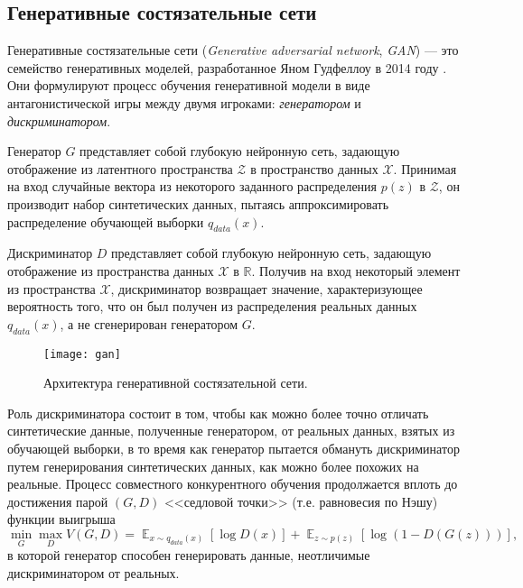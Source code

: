 
\subsection{Генеративные состязательные сети}

Генеративные состязательные сети (\emph{Generative adversarial network},  \emph{GAN}) --- это семейство генеративных моделей, разработанное Яном Гудфеллоу в 2014 году \cite{goodfellow2014generative}.  Они формулируют процесс обучения  генеративной модели в виде антагонистической игры между двумя игроками: \emph{генератором} и \emph{дискриминатором}.

Генератор $G$ представляет собой глубокую нейронную сеть, задающую отображение из латентного пространства $\mathcal Z$ в пространство данных $\mathcal X$.
Принимая на вход случайные вектора из некоторого заданного распределения $p(z)$ в $\mathcal Z$, он производит набор синтетических данных, пытаясь аппроксимировать распределение обучающей выборки $q_{data}(x)$.

Дискриминатор $D$ представляет собой глубокую нейронную сеть, задающую отображение из пространства данных $\mathcal X$ в $\mathbb R$. Получив на вход некоторый элемент из пространства $\mathcal X$, дискриминатор возвращает значение, характеризующее вероятность того, что он был получен из распределения реальных данных $q_{data}(x)$, а не сгенерирован генератором $G$.

\begin{figure}[h]
\begin{center}
    \texttt{[image: gan]}
    \caption{Архитектура генеративной состязательной сети.}
    \label{fig:subim11}
\end{center}
\end{figure}

Роль дискриминатора состоит в том, чтобы как можно более точно отличать синтетические данные, полученные генератором, от реальных данных, взятых из обучающей выборки, в то время как генератор пытается обмануть дискриминатор путем генерирования синтетических данных, как можно более похожих на реальные.
Процесс совместного конкурентного обучения продолжается вплоть до достижения парой $(G, D)$ <<седловой точки>> (т.е. равновесия по Нэшу) \cite{goodfellow2017nips} функции выигрыша
$$
\min_{G} \max_{D} V(G, D) = \mathop{\mathbb{E}}_{x \sim q_{data}(x)} [\log D(x)] + \mathop{\mathbb{E}}_{z \sim p(z)} [\log (1 - D(G(z)))] ,
$$
в которой генератор способен генерировать данные, неотличимые дискриминатором от реальных.


